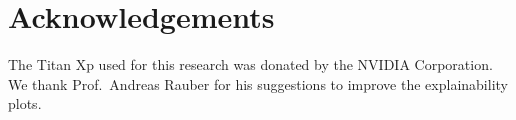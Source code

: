 \documentclass[10pt,sigconf,letterpaper,dvipsnames]{acmart}
\begin{document}
\section*{Acknowledgements}
The Titan Xp used for this research was donated by the NVIDIA Corporation. We thank Prof.~Andreas Rauber for his suggestions to improve the explainability plots.



%




%
%
\end{document}
